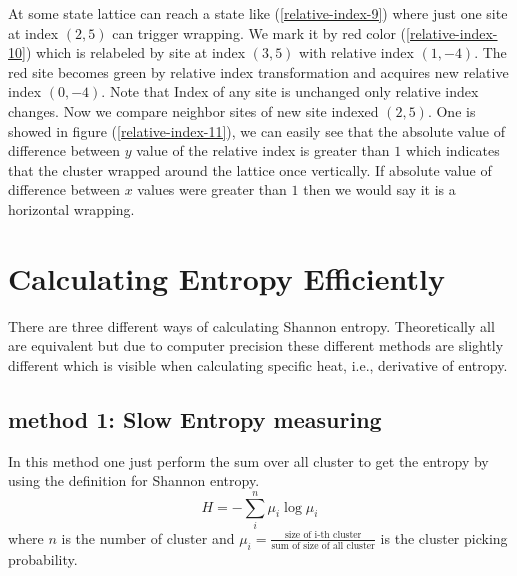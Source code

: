  At some state lattice can reach a state like (\ref{relative-index-9}) where just one site at index $(2,5)$ can trigger wrapping. We mark it by red color (\ref{relative-index-10}) which is relabeled by site at index $(3,5)$ with relative index $(1,-4)$. The red site becomes green by relative index transformation and acquires new relative index $(0,-4)$. Note that Index of any site is unchanged only relative index changes. Now we compare neighbor sites of new site indexed $(2,5)$. One is showed in figure (\ref{relative-index-11}), we can easily see that the absolute value of difference between $y$ value of the relative index is greater than $1$ which indicates that the cluster wrapped around the lattice once vertically. If absolute value of difference between $x$ values were greater than $1$ then we would say it is a horizontal wrapping.
\begin{figure}
	\centering
	\caption{}
	\label{fig:relative-index-4}
\end{figure}



\section{Calculating Entropy Efficiently}
	There are three different ways of calculating Shannon entropy. Theoretically all are equivalent but due to computer precision these different methods are slightly different which is visible when calculating specific heat, i.e., derivative of entropy.
	\subsection{method 1: Slow Entropy measuring}
	In this method one just perform the sum over all cluster to get the entropy by using the definition for Shannon entropy.
	\begin{equation}
		H = - \sum_{i}^{n} \mu_i \log \mu_i
		\label{eqn.shannon-entropy}
	\end{equation}
	where $n$ is the number of cluster and $\mu_i = \frac{\text{size of i-th cluster}}{\text{sum of size of all cluster}}$ is the cluster picking probability.
	
